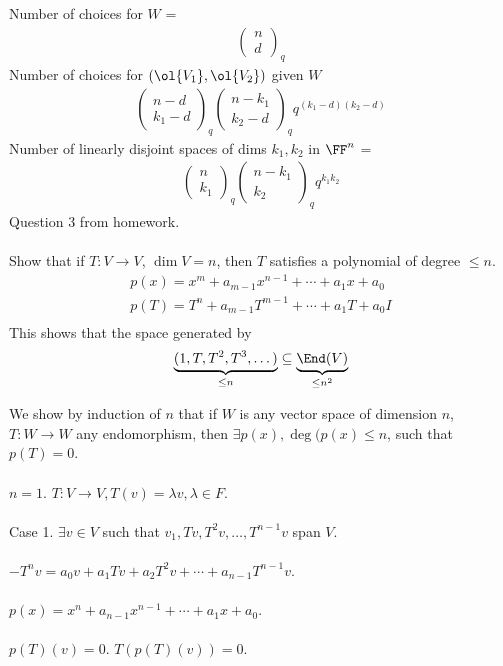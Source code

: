 \documentclass[class=scrartcl, crop=false]{standalone}
\begin{document}
Number of choices for $W$ = 
\begin{gather*}
  \begin{pmatrix}
    n \\ d
  \end{pmatrix}_q
\end{gather*} 
Number of choices for $(\ol{V_1}, \ol{V_2})$ given $W$ 
\begin{gather*}
  \begin{pmatrix}
    n - d \\ k_1 - d
  \end{pmatrix}_q
  \begin{pmatrix}
    n - k_1 \\ k_2 - d
  \end{pmatrix}_q
  q^{(k_1 - d)(k_2 - d)}
\end{gather*} 
Number of linearly disjoint spaces of dims $k_1, k_2$ in $\FF^n$ =
\begin{gather*}
  \begin{pmatrix}
    n \\ k_1
  \end{pmatrix}_q
  \begin{pmatrix}
    n - k_1 \\ k_2
  \end{pmatrix}_q
  q^{k_1k_2}
\end{gather*} 
Question 3 from homework.
\\\\
Show that if $T: V \to V$, $\dim V = n$, then $T$ satisfies a polynomial of degree $\leq n$.
\begin{gather*}
  p(x) = x^m + a_{m - 1}x^{n - 1} + \cdots + a_1x + a_0 \\
  p(T) = T^n + a_{m - 1}T^{m - 1} + \cdots + a_1T + a_0I \\
\end{gather*} 
This shows that the space generated by 
\begin{gather*}
  \underbrace{(1, T,  T^2, T^3, \dots)}_{\leq n} \subseteq \underbrace{\End(V)}_{\leq n^2}
\end{gather*} 

We show by induction of $n$ that if $W$ is any vector space of dimension $n$, $T: W \to W$ any endomorphism, then $\exists p(x), \deg(p(x) \leq n$, such that $p(T) = 0$.
\\\\
$n = 1$. $T: V \to V, T(v) = \lambda v, \lambda \in F$.
\\\\
Case 1.  $\exists v \in V$ such that $v_1, Tv, T^2 v, \dots, T^{n - 1}v$ span $V$.
\\\\
$-T^nv = a_0v + a_1Tv + a_2T^2v + \cdots + a_{n  -1}T^{n - 1}v$.
\\\\
$p(x) = x^n + a_{n - 1}x^{n - 1} + \cdots + a_1x + a_0$.
\\\\
$p(T)(v) = 0$. $T(p(T)(v)) = 0$.
\end{document}
